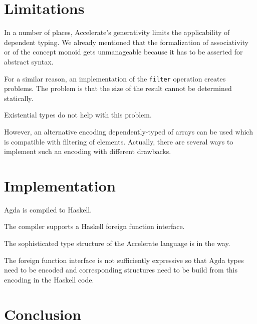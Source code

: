 \documentclass{llncs}
\begin{document}
\section{Limitations}
\label{sec:limitations}

In a number of places, Accelerate's generativity limits the
applicability of dependent typing. We already mentioned that the
formalization of associativity or of the concept monoid gets
unmanageable because it has to be asserted for abstract syntax.

For a similar reason, an implementation of the \texttt{filter}
operation creates problems. The problem is that the size of the result
cannot be determined statically. 

Existential types do not help with this problem.

However, an alternative encoding dependently-typed of arrays can be
used which is compatible with filtering of elements. Actually, there
are several ways to implement such an encoding with different drawbacks.

\section{Implementation}
\label{sec:implementation}

Agda is compiled to Haskell.

The compiler supports a Haskell foreign function interface. 

The sophisticated type structure of the Accelerate language is in the
way.

The foreign function interface is not sufficiently expressive so that
Agda types need to be encoded and corresponding structures need to be
build from this encoding in the Haskell code. 

\section{Conclusion}
\label{sec:conclusion}


%
%


\end{document}
